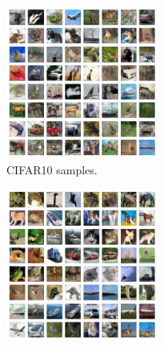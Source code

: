 \documentclass{article}
\newcommand{\figureHeight}{5cm}
\begin{document}
\begin{figure}[p]
    \centering
    \begin{subfigure}[t]{0.49\textwidth}
        \centering
        \includegraphics[height=\figureHeight]{cifar10_samples.png}
        \caption{\label{fig:cifar10_samples} CIFAR10 samples.}
    \end{subfigure}
    \hfill
    \begin{subfigure}[t]{0.49\textwidth}
        \centering
        \includegraphics[height=\figureHeight]{cifar10_reconstructions.png}

\end{subfigure}
\end{figure}
\end{document}
